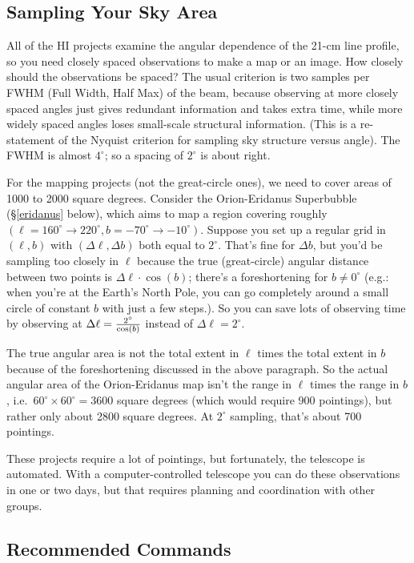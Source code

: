 \documentclass[psfig,preprint]{aastex}
\begin{document}
\subsection{Sampling Your Sky Area}
All of the HI projects examine the angular dependence of the 21-cm line
profile, so you need closely spaced observations to make a map or an
image. How closely should the observations be spaced?  The usual
criterion is two samples per FWHM (Full Width, Half Max) of the beam, because
observing at more closely spaced angles just gives redundant information
and takes extra time, while more widely spaced angles loses small-scale
structural information. (This is a re-statement of the Nyquist criterion for sampling
sky structure versus angle).  The FWHM is
almost $4^\circ$; so a spacing of $2^\circ$ is about right.

For the mapping projects (not the great-circle ones), we need to cover
areas of 1000 to 2000 square degrees. Consider the Orion-Eridanus
Superbubble (\S \ref{eridanus} below), which aims to map a region
covering roughly $(\ell=160^\circ \rightarrow 220^\circ, b=-70^\circ
\rightarrow -10^\circ)$. Suppose you set up a regular grid in
$(\ell,b)$ with $(\Delta \ell, \Delta b)$ both equal to
$2^\circ$. That's fine for $\Delta b$, but you'd be sampling too closely
in $\ell$ because the true (great-circle) angular distance
between two points is $\Delta \ell \cdot \cos(b)$; there's a
foreshortening for $b \neq 0^\circ$ (e.g.: when you're at the Earth's
North Pole, you can go completely around a small circle of constant $b$
with just a few steps.). So you can save lots of observing time by
observing at $\Delta \ell = {2^\circ \over \cos(b)}$ instead of $\Delta
\ell = 2^\circ$.

The true angular area is not the total extent in $\ell$ times the total
extent in $b$ because of the foreshortening discussed in the above
paragraph. So the actual angular area of the Orion-Eridanus map
isn't the range in $\ell$ times the range in $b$, i.e.\ $60^\circ
\times 60^\circ = 3600$ square degrees (which would require 900
pointings), but rather only about 2800 square degrees.  At $2^\circ$
sampling, that's about 700 pointings.

These projects require a lot of pointings,
but fortunately, the telescope is automated. With a
computer-controlled telescope you can do these observations in one
or two days, but that requires planning and coordination with other
groups.

\subsection{Recommended Commands} \label{mappingcommands}
\end{document}
